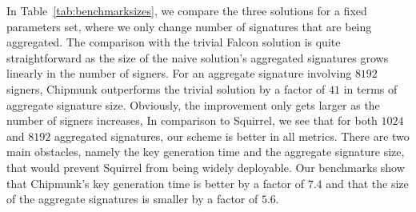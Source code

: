 In Table~\ref{tab:benchmarksizes}, we compare the three solutions for a fixed parameters set, where we only change number of signatures that are being aggregated.
The comparison with the trivial Falcon solution is quite straightforward as the size of the naive solution's aggregated signatures grows linearly in the number of signers.
For an aggregate signature involving $8192$ signers, Chipmunk outperforms the trivial solution by a factor of $41$ in terms of aggregate signature size.
Obviously, the improvement only gets larger as the number of signers increases,
In comparison to Squirrel, we see that for both $1024$ and $8192$ aggregated signatures, our scheme is better in all metrics.
There are two main obstacles, namely the key generation time and the aggregate signature size, that would prevent Squirrel from being widely deployable.
Our benchmarks show that Chipmunk's key generation time is better by a factor of $7.4$ and that the size of the aggregate signatures is smaller by a factor of $5.6$.%
\bgroup
\setlength{\tabcolsep}{0.5em}
\renewcommand{\arraystretch}{1.1}
